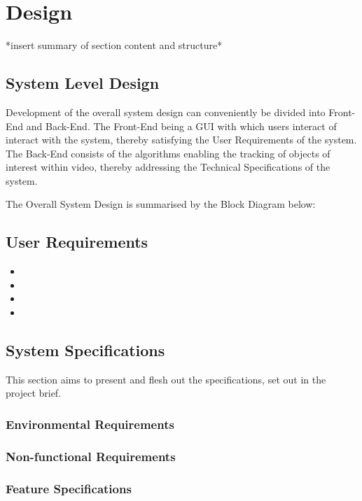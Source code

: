 \chapter{Design}\label{design}
*insert summary of section content and structure*

\section{System Level Design}
Development of the overall system design can conveniently be divided into
Front-End and Back-End. The Front-End being a GUI with which users interact 
of interact with the system, thereby satisfying the User Requirements of the
system.
The Back-End consists of the algorithms enabling the tracking of objects of
interest within video, thereby addressing the Technical Specifications of the
system.

The Overall System Design is summarised by the Block Diagram below: 


\section{User Requirements}
\begin{itemize}
    \item 
    \item
    \item
    \item
\end{itemize}

\section{System Specifications}
This section aims to present and flesh out the specifications, set out in the
project brief.

\subsection{Environmental Requirements}

\subsection{Non-functional Requirements}

\subsection{Feature Specifications}

